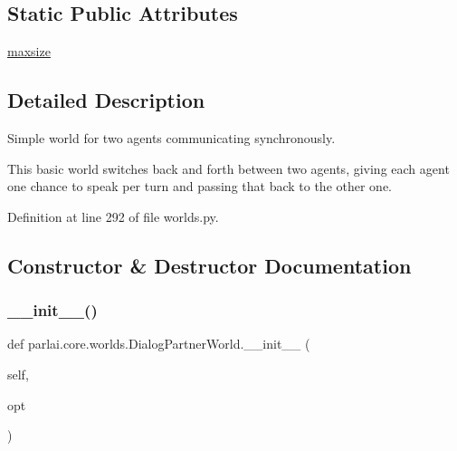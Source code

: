 \subsection*{Static Public Attributes}
\begin{DoxyCompactItemize}
\item 
\hyperlink{classparlai_1_1core_1_1worlds_1_1DialogPartnerWorld_acae28d33fb7d494b7df84d0f8c57eb23}{maxsize}
\end{DoxyCompactItemize}


\subsection{Detailed Description}
\begin{DoxyVerb}Simple world for two agents communicating synchronously.

This basic world switches back and forth between two agents, giving each agent one
chance to speak per turn and passing that back to the other one.
\end{DoxyVerb}
 

Definition at line 292 of file worlds.\+py.



\subsection{Constructor \& Destructor Documentation}
\mbox{\label{classparlai_1_1core_1_1worlds_1_1DialogPartnerWorld_a4f9a54febb70ef1f1a015cd3e137fcaa}} 
\subsubsection{\texorpdfstring{\+\_\+\+\_\+init\+\_\+\+\_\+()}{\_\_init\_\_()}}
{\footnotesize\ttfamily def parlai.\+core.\+worlds.\+Dialog\+Partner\+World.\+\_\+\+\_\+init\+\_\+\+\_\+ (\begin{DoxyParamCaption}\item[{}]{self,  }\item[{}]{opt }\end{DoxyParamCaption})}



